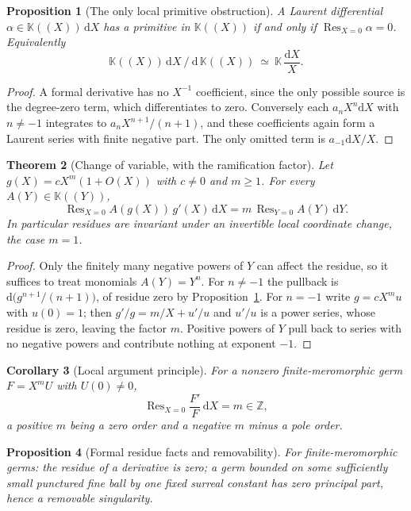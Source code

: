 \documentclass[11pt,a4paper]{article}
\numberwithin{equation}{section}
\newtheorem{theorem}{Theorem}[section]
\newtheorem{proposition}[theorem]{Proposition}
\newtheorem{corollary}[theorem]{Corollary}
\theoremstyle{definition}
\theoremstyle{remark}
\theoremstyle{plain}
\newcommand{\K}{\mathbb K}
\newcommand{\ZZ}{\mathbb Z}
\DeclareMathOperator{\Res}{Res}                 %
\newcommand{\dd}{\mathrm d}
\begin{document}
\begin{proposition}[The only local primitive obstruction]
\label{b:formalprimitive}
A Laurent differential $\alpha\in\K((X))\,\dd X$ has a primitive in
$\K((X))$ if and only if $\Res_{X=0}\alpha=0$. Equivalently
\[
 \K((X))\,\dd X\ /\ \dd\,\K((X))\ \simeq\ \K\,\frac{\dd X}{X}.
\]
\end{proposition}

\begin{proof}
A formal derivative has no $X^{-1}$ coefficient, since the only possible
source is the degree-zero term, which differentiates to zero. Conversely
each $a_nX^{n}\dd X$ with $n\ne-1$ integrates to $a_nX^{n+1}/(n+1)$, and
these coefficients again form a Laurent series with finite negative part.
The only omitted term is $a_{-1}\dd X/X$.
\end{proof}

\begin{theorem}[Change of variable, with the ramification factor]
\label{b:reschange}
Let $g(X)=cX^{m}(1+O(X))$ with $c\ne0$ and $m\ge1$. For every
$A(Y)\in\K((Y))$,
\begin{equation}
\label{b:eq-reschange}
 \Res_{X=0}A(g(X))\,g'(X)\,\dd X=m\,\Res_{Y=0}A(Y)\,\dd Y .
\end{equation}
In particular residues are invariant under an invertible local coordinate
change, the case $m=1$.
\end{theorem}

\begin{proof}
Only the finitely many negative powers of $Y$ can affect the residue, so
it suffices to treat monomials $A(Y)=Y^{n}$. For $n\ne-1$ the pullback is
$\dd\bigl(g^{n+1}/(n+1)\bigr)$, of residue zero by
Proposition~\ref{b:formalprimitive}. For $n=-1$ write $g=cX^{m}u$ with
$u(0)=1$; then $g'/g=m/X+u'/u$ and $u'/u$ is a power series, whose residue
is zero, leaving the factor $m$. Positive powers of $Y$ pull back to
series with no negative powers and contribute nothing at exponent $-1$.
\end{proof}

\begin{corollary}[Local argument principle]
\label{b:localargument}
For a nonzero finite-meromorphic germ $F=X^{m}U$ with $U(0)\ne0$,
\[
 \Res_{X=0}\frac{F'}{F}\,\dd X=m\in\ZZ ,
\]
a positive $m$ being a zero order and a negative $m$ minus a pole order.
\end{corollary}

\begin{proposition}[Formal residue facts and removability]
\label{b:formalres}
For finite-meromorphic germs: the residue of a derivative is zero; a germ
bounded on some sufficiently small punctured fine ball by one fixed surreal
constant has zero principal part, hence a removable singularity.
\end{proposition}
\end{document}

